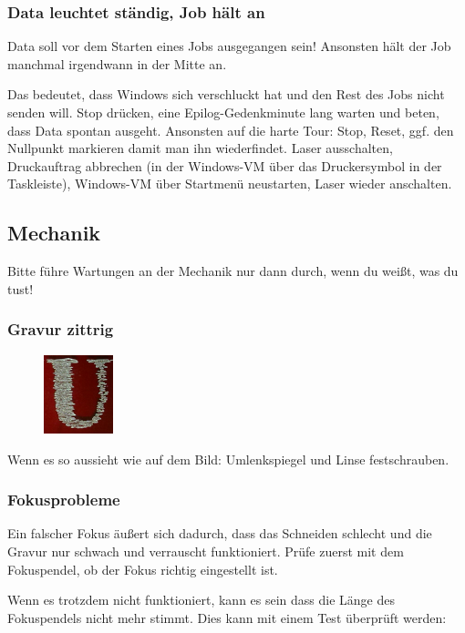 \documentclass{\basedir/fablab-document}
\begin{document}
\subsubsection{Data leuchtet ständig, Job hält an}
Data soll vor dem Starten eines Jobs ausgegangen sein! Ansonsten hält der Job manchmal irgendwann in der Mitte an.

Das bedeutet, dass Windows sich verschluckt hat und den Rest des Jobs nicht senden will. Stop drücken, eine Epilog-Gedenkminute lang warten und beten, dass Data spontan ausgeht. Ansonsten auf die harte Tour: Stop, Reset, ggf. den Nullpunkt markieren damit man ihn wiederfindet. Laser ausschalten, Druckauftrag abbrechen (in der Windows-VM über das Druckersymbol in der Taskleiste), Windows-VM über Startmenü neustarten, Laser wieder anschalten.

\subsection{Mechanik}
Bitte führe Wartungen an der Mechanik nur dann durch, wenn du weißt, was du tust!

\subsubsection{Gravur zittrig}
\begin{figure}
  \vspace{-50pt} %
  \includegraphics[width=2cm]{./img/fehler-umlenkspiegel.png}
  \vspace{-20pt} %
\end{figure}
 Wenn es so aussieht wie auf dem Bild: Umlenkspiegel und Linse festschrauben.

\subsubsection{Fokusprobleme}
Ein falscher Fokus äußert sich dadurch, dass das Schneiden schlecht und die Gravur nur schwach und verrauscht funktioniert. Prüfe zuerst mit dem Fokuspendel, ob der Fokus richtig eingestellt ist.

Wenn es trotzdem nicht funktioniert, kann es sein dass die Länge des Fokuspendels nicht mehr stimmt. Dies kann mit einem Test überprüft werden:
\end{document}
